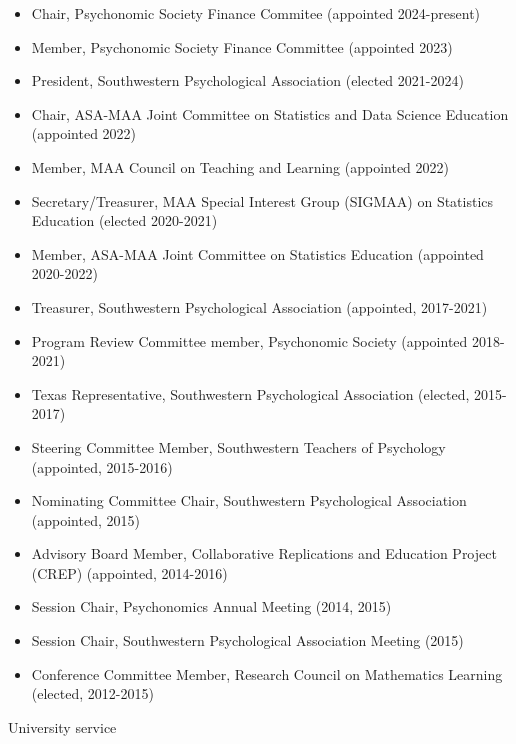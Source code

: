 \documentclass[article,10pt]{article}
\begin{document}
\begin{itemize}
\item Chair, Psychonomic Society Finance Commitee (appointed 2024-present)
\item Member, Psychonomic Society Finance Committee (appointed 2023)
\item President, Southwestern Psychological Association (elected 2021-2024)
\item Chair, ASA-MAA Joint Committee on Statistics and Data Science Education (appointed 2022)
\item Member, MAA Council on Teaching and Learning (appointed 2022)
\item Secretary/Treasurer, MAA Special Interest Group (SIGMAA) on Statistics Education (elected 2020-2021)
\item Member, ASA-MAA Joint Committee on Statistics Education (appointed 2020-2022)
\item Treasurer, Southwestern Psychological Association (appointed, 2017-2021)
\item Program Review Committee member, Psychonomic Society (appointed 2018-2021)
\item Texas Representative, Southwestern Psychological Association (elected, 2015-2017)
\item Steering Committee Member, Southwestern Teachers of Psychology (appointed, 2015-2016)
\item Nominating Committee Chair, Southwestern Psychological Association (appointed, 2015)
\item Advisory Board Member, Collaborative Replications and Education Project (CREP) (appointed, 2014-2016)
\item Session Chair, Psychonomics Annual Meeting (2014, 2015)
\item Session Chair, Southwestern Psychological Association Meeting (2015)
\item Conference Committee Member, Research Council on Mathematics Learning (elected, 2012-2015)
\end{itemize}

University service
\end{document}
